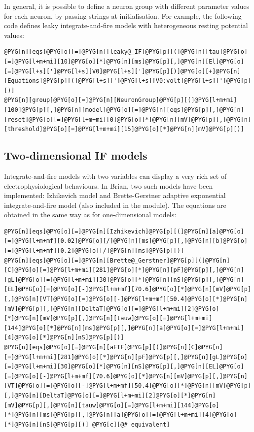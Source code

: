 \documentclass[letterpaper,10pt,english]{manual}
\begin{document}
In general, it is possible to define a neuron group with different parameter values for each neuron, by
passing strings at initialisation. For example, the following code defines leaky integrate-and-fire models
with heterogeneous resting potential values:

\begin{Verbatim}[commandchars=@\[\]]
@PYG[n][eqs]@PYG[o][=]@PYG[n][leaky@_IF]@PYG[p][(]@PYG[n][tau]@PYG[o][=]@PYG[l+m+mi][10]@PYG[o][*]@PYG[n][ms]@PYG[p][,]@PYG[n][El]@PYG[o][=]@PYG[l+s][']@PYG[l+s][V0]@PYG[l+s][']@PYG[p][)]@PYG[o][+]@PYG[n][Equations]@PYG[p][(]@PYG[l+s][']@PYG[l+s][V0:volt]@PYG[l+s][']@PYG[p][)]
@PYG[n][group]@PYG[o][=]@PYG[n][NeuronGroup]@PYG[p][(]@PYG[l+m+mi][100]@PYG[p][,]@PYG[n][model]@PYG[o][=]@PYG[n][eqs]@PYG[p][,]@PYG[n][reset]@PYG[o][=]@PYG[l+m+mi][0]@PYG[o][*]@PYG[n][mV]@PYG[p][,]@PYG[n][threshold]@PYG[o][=]@PYG[l+m+mi][15]@PYG[o][*]@PYG[n][mV]@PYG[p][)]
\end{Verbatim}


\subsection{Two-dimensional IF models}

Integrate-and-fire models with two variables can display a very rich set of electrophysiological behaviours.
In Brian, two such models have been implemented: Izhikevich model and Brette-Gerstner adaptive exponential
integrate-and-fire model (also included in the  module).
The equations are obtained in the same way as for one-dimensional models:

\begin{Verbatim}[commandchars=@\[\]]
@PYG[n][eqs]@PYG[o][=]@PYG[n][Izhikevich]@PYG[p][(]@PYG[n][a]@PYG[o][=]@PYG[l+m+mf][0.02]@PYG[o][/]@PYG[n][ms]@PYG[p][,]@PYG[n][b]@PYG[o][=]@PYG[l+m+mf][0.2]@PYG[o][/]@PYG[n][ms]@PYG[p][)]
@PYG[n][eqs]@PYG[o][=]@PYG[n][Brette@_Gerstner]@PYG[p][(]@PYG[n][C]@PYG[o][=]@PYG[l+m+mi][281]@PYG[o][*]@PYG[n][pF]@PYG[p][,]@PYG[n][gL]@PYG[o][=]@PYG[l+m+mi][30]@PYG[o][*]@PYG[n][nS]@PYG[p][,]@PYG[n][EL]@PYG[o][=]@PYG[o][-]@PYG[l+m+mf][70.6]@PYG[o][*]@PYG[n][mV]@PYG[p][,]@PYG[n][VT]@PYG[o][=]@PYG[o][-]@PYG[l+m+mf][50.4]@PYG[o][*]@PYG[n][mV]@PYG[p][,]@PYG[n][DeltaT]@PYG[o][=]@PYG[l+m+mi][2]@PYG[o][*]@PYG[n][mV]@PYG[p][,]@PYG[n][tauw]@PYG[o][=]@PYG[l+m+mi][144]@PYG[o][*]@PYG[n][ms]@PYG[p][,]@PYG[n][a]@PYG[o][=]@PYG[l+m+mi][4]@PYG[o][*]@PYG[n][nS]@PYG[p][)]
@PYG[n][eqs]@PYG[o][=]@PYG[n][aEIF]@PYG[p][(]@PYG[n][C]@PYG[o][=]@PYG[l+m+mi][281]@PYG[o][*]@PYG[n][pF]@PYG[p][,]@PYG[n][gL]@PYG[o][=]@PYG[l+m+mi][30]@PYG[o][*]@PYG[n][nS]@PYG[p][,]@PYG[n][EL]@PYG[o][=]@PYG[o][-]@PYG[l+m+mf][70.6]@PYG[o][*]@PYG[n][mV]@PYG[p][,]@PYG[n][VT]@PYG[o][=]@PYG[o][-]@PYG[l+m+mf][50.4]@PYG[o][*]@PYG[n][mV]@PYG[p][,]@PYG[n][DeltaT]@PYG[o][=]@PYG[l+m+mi][2]@PYG[o][*]@PYG[n][mV]@PYG[p][,]@PYG[n][tauw]@PYG[o][=]@PYG[l+m+mi][144]@PYG[o][*]@PYG[n][ms]@PYG[p][,]@PYG[n][a]@PYG[o][=]@PYG[l+m+mi][4]@PYG[o][*]@PYG[n][nS]@PYG[p][)] @PYG[c][@# equivalent]
\end{Verbatim}
\end{document}
